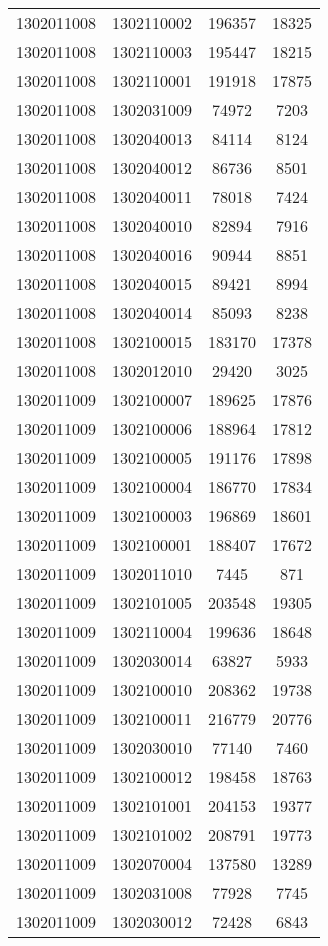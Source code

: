 \begin{longtable}{llcc}
1302011008 & 1302110002 & 196357 & 18325\\
1302011008 & 1302110003 & 195447 & 18215\\
1302011008 & 1302110001 & 191918 & 17875\\
1302011008 & 1302031009 & 74972 & 7203\\
1302011008 & 1302040013 & 84114 & 8124\\
1302011008 & 1302040012 & 86736 & 8501\\
1302011008 & 1302040011 & 78018 & 7424\\
1302011008 & 1302040010 & 82894 & 7916\\
1302011008 & 1302040016 & 90944 & 8851\\
1302011008 & 1302040015 & 89421 & 8994\\
1302011008 & 1302040014 & 85093 & 8238\\
1302011008 & 1302100015 & 183170 & 17378\\
1302011008 & 1302012010 & 29420 & 3025\\
1302011009 & 1302100007 & 189625 & 17876\\
1302011009 & 1302100006 & 188964 & 17812\\
1302011009 & 1302100005 & 191176 & 17898\\
1302011009 & 1302100004 & 186770 & 17834\\
1302011009 & 1302100003 & 196869 & 18601\\
1302011009 & 1302100001 & 188407 & 17672\\
1302011009 & 1302011010 & 7445 & 871\\
1302011009 & 1302101005 & 203548 & 19305\\
1302011009 & 1302110004 & 199636 & 18648\\
1302011009 & 1302030014 & 63827 & 5933\\
1302011009 & 1302100010 & 208362 & 19738\\
1302011009 & 1302100011 & 216779 & 20776\\
1302011009 & 1302030010 & 77140 & 7460\\
1302011009 & 1302100012 & 198458 & 18763\\
1302011009 & 1302101001 & 204153 & 19377\\
1302011009 & 1302101002 & 208791 & 19773\\
1302011009 & 1302070004 & 137580 & 13289\\
1302011009 & 1302031008 & 77928 & 7745\\
1302011009 & 1302030012 & 72428 & 6843\\

\end{longtable}
